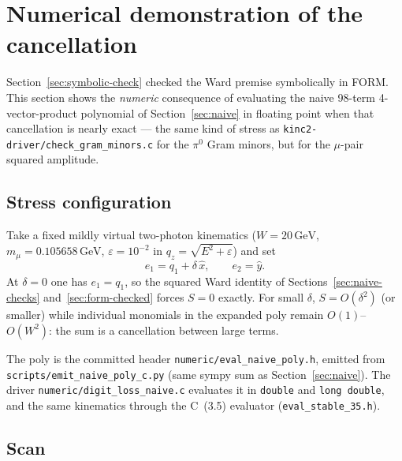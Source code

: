 \documentclass[11pt]{article}
\begin{document}
\section{Numerical demonstration of the cancellation}
\label{sec:numerics}

Section~\ref{sec:symbolic-check} checked the Ward premise symbolically in
FORM. This section shows the \emph{numeric} consequence of evaluating the
naive 98-term 4-vector-product polynomial of Section~\ref{sec:naive} in
floating point when that cancellation is nearly exact --- the same kind of
stress as \texttt{kinc2-driver/check\_gram\_minors.c} for the $\pi^0$ Gram
minors, but for the $\mu$-pair squared amplitude.

\subsection{Stress configuration}
\label{sec:numerics-setup}

Take a fixed mildly virtual two-photon kinematics ($W=20\,\mathrm{GeV}$,
$m_\mu=0.105658\,\mathrm{GeV}$, $\varepsilon=10^{-2}$ in
$q_z=\sqrt{E^2+\varepsilon}$) and set
\begin{equation}
  e_1 = q_1 + \delta\,\hat x,\qquad e_2 = \hat y.
\end{equation}
At $\delta=0$ one has $e_1=q_1$, so the squared Ward identity of
Sections~\ref{sec:naive-checks} and~\ref{sec:form-checked} forces
$S=0$ exactly. For small $\delta$, $S=O(\delta^2)$ (or smaller) while
individual monomials in the expanded poly remain $O(1)$--$O(W^2)$: the
sum is a cancellation between large terms.

The poly is the committed header
\texttt{numeric/eval\_naive\_poly.h}, emitted from
\texttt{scripts/emit\_naive\_poly\_c.py} (same sympy sum as
Section~\ref{sec:naive}). The driver
\texttt{numeric/digit\_loss\_naive.c} evaluates it in \texttt{double} and
\texttt{long double}, and the same kinematics through the C~(3.5)
evaluator (\texttt{eval\_stable\_35.h}).

\subsection{Scan}
\label{sec:numerics-scan}
\end{document}
